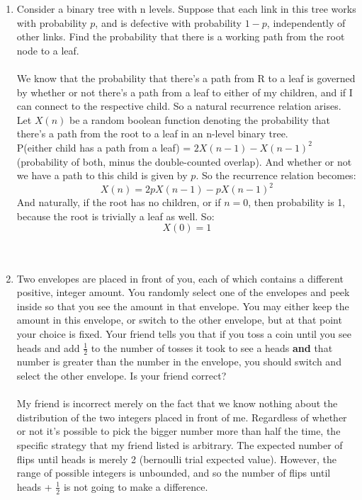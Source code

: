 \begin{enumerate}
  \item Consider a binary tree with n levels. Suppose that each link in this tree works with probability $p$, and is defective with probability $1-p$, independently of other links. Find the probability that there is a working path from the root node to a leaf.\\\\

    We know that the probability that there's a path from R to a leaf is governed by whether or not there's a path from a leaf to either of my children, and if I can connect to the respective child. So a natural recurrence relation arises.\\
    Let $X(n)$ be a random boolean function denoting the probability that there's a path from the root to a leaf in an n-level binary tree.\\

    P(either child has a path from a leaf) = $2X(n-1) - X(n-1)^2$ (probability of both, minus the double-counted overlap). And whether or not we have a path to this child is given by $p$. So the recurrence relation becomes:
    $$X(n) = 2pX(n-1) - pX(n-1)^2$$
    And naturally, if the root has no children, or if $n = 0$, then probability is 1, because the root is trivially a leaf as well. So:
    $$X(0) = 1$$\\\\

  \item Two envelopes are placed in front of you, each of which contains a different positive, integer amount. You randomly select one of the envelopes and peek inside so that you see the amount in that envelope. You may either keep the amount in this envelope, or switch to the other envelope, but at that point your choice is fixed. Your friend tells you that if you toss a coin until you see heads and add $\frac{1}{2}$ to the number of tosses it took to see a heads \textbf{and} that number is greater than the number in the envelope, you should switch and select the other envelope. Is your friend correct?\\\\

    My friend is incorrect merely on the fact that we know nothing about the distribution of the two integers placed in front of me. Regardless of whether or not it's possible to pick the bigger number more than half the time, the specific strategy that my friend listed is arbitrary. The expected number of flips until heads is merely 2 (bernoulli trial expected value). However, the range of possible integers is unbounded, and so the number of flips until heads + $\frac{1}{2}$ is not going to make a difference.



\end{enumerate}

